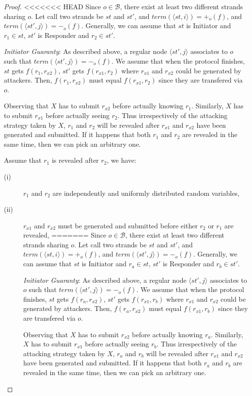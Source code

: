 \begin{proof}

<<<<<<< HEAD
Since $o \in \mathcal{B}$, there exist at least two different strands sharing $o$. Let call two strands be $st$ and $st'$, and $term(\langle st,i\rangle )=+_o(f)$, and $term(\langle st',j\rangle ) = -_o(f)$. Generally, we can assume that $st$ is Initiator and $r_1 \in st$, $st'$ is Responder and $r_2 \in st'$. 

\emph{Initiator Guaranty}: As described above, a regular node $\langle st',j\rangle $ associates to $o$ such that $term(\langle st',j\rangle ) = -_o(f)$. We assume that when the protocol finishes, $st$ gets $f(r_1,r_{x2})$, $st'$ gets $f(r_{x1},r_2)$ where $r_{x1}$ and $r_{x2}$ could be generated by attackers. Then, $f(r_1,r_{x2})$ must equal $f(r_{x1},r_2)$ since they are transfered via $o$. 

Observing that $X$ has to submit $r_{x2}$ before actually knowing $r_1$. Similarly, $X$ has to submit $r_{x1}$ before actually seeing $r_2$. Thus irrespectively of the attacking strategy taken by $X$, $r_1$ and $r_2$ will be revealed after $r_{x1}$ and $r_{x2}$ have been generated and submitted. If it happens that both $r_1$ and $r_2$ are revealed in the same time, then we can pick an arbitrary one. 

Assume that $r_1$ is revealed after $r_2$, we have:
\begin{description}
 \item [(i)] $r_1$ and $r_2$ are independently and uniformly distributed random variables, 
 \item [(ii)] $r_{x1}$ and $r_{x2}$ must be generated and submitted before either $r_2$ or $r_1$ are revealed, 
=======
Since $o \in \mathcal{B}$, there exist at least two different strands sharing $o$. Let call two strands be $st$ and $st'$, and $term(\langle st,i\rangle )=+_o(f)$, and $term(\langle st',j\rangle ) = -_o(f)$. Generally, we can assume that $st$ is Initiator and $r_a \in st$, $st'$ is Responder and $r_b \in st'$. 

\emph{Initiator Guaranty}: As described above, a regular node $\langle st',j\rangle $ associates to $o$ such that $term(\langle st',j\rangle ) = -_o(f)$. We assume that when the protocol finishes, $st$ gets $f(r_a,r_{x2})$, $st'$ gets $f(r_{x1},r_b)$ where $r_{x1}$ and $r_{x2}$ could be generated by attackers. Then, $f(r_a,r_{x2})$ must equal $f(r_{x1},r_b)$ since they are transfered via $o$. 

Observing that $X$ has to submit $r_{x2}$ before actually knowing $r_a$. Similarly, $X$ has to submit $r_{x1}$ before actually seeing $r_b$. Thus irrespectively of the attacking strategy taken by $X$, $r_a$ and $r_b$ will be revealed after $r_{x1}$ and $r_{x2}$ have been generated and submitted. If it happens that both $r_a$ and $r_b$ are revealed in the same time, then we can pick an arbitrary one. 


\end{description}
\end{proof}
